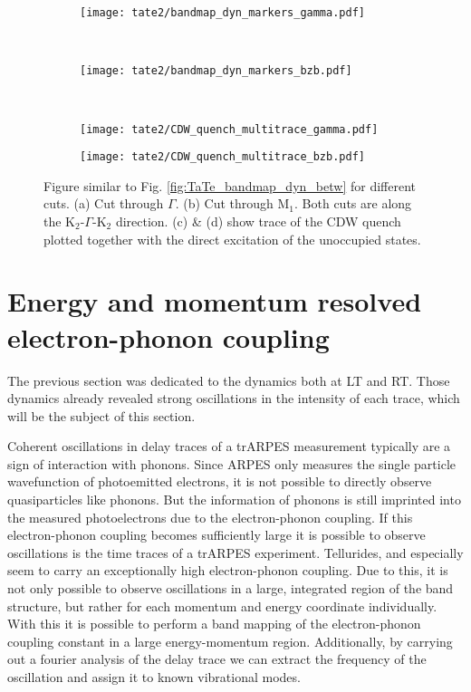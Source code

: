 \begin{figure}[h!]
	\centering
	\begin{subfigure}[b]{\textwidth}
		\texttt{[image: tate2/bandmap\_dyn\_markers\_gamma.pdf]}
		\caption{}
	\end{subfigure}
	\\
	\centering
	\begin{subfigure}[b]{\textwidth}
		\texttt{[image: tate2/bandmap\_dyn\_markers\_bzb.pdf]}
		\caption{}
	\end{subfigure}
	\\
	\begin{subfigure}[b]{0.33\textwidth}
		\texttt{[image: tate2/CDW\_quench\_multitrace\_gamma.pdf]}
		\caption{}
	\end{subfigure}
	\begin{subfigure}[b]{0.33\textwidth}
		\texttt{[image: tate2/CDW\_quench\_multitrace\_bzb.pdf]}
		\caption{}
	\end{subfigure}
	\caption{Figure similar to Fig. \ref{fig:TaTe_bandmap_dyn_betw} for different cuts. (a) Cut through $\Gamma$. (b) Cut through M$_1$. Both cuts are along the K$_2$-$\Gamma$-K$_2$ direction. (c) \& (d) show trace of the CDW quench plotted together with the direct excitation of the unoccupied states.}
	\label{fig:TaTe_bandmap_dyn_bzb}
\end{figure}

\section{Energy and momentum resolved electron-phonon coupling}
\label{sec:phonon_osc}

The previous section was dedicated to the dynamics both at LT and RT.
Those dynamics already revealed strong oscillations in the intensity of each trace, which will be the subject of this section.

Coherent oscillations in delay traces of a trARPES measurement typically are a sign of interaction with phonons.
Since ARPES only measures the single particle wavefunction of photoemitted electrons, it is not possible to directly observe quasiparticles like phonons.
But the information of phonons is still imprinted into the measured photoelectrons due to the electron-phonon coupling.
If this electron-phonon coupling becomes sufficiently large it is possible to observe oscillations is the time traces of a trARPES experiment.
Tellurides, and especially  seem to carry an exceptionally high electron-phonon coupling.
Due to this, it is not only possible to observe oscillations in a large, integrated region of the band structure, but rather for each momentum and energy coordinate individually.
With this it is possible to perform a band mapping of the electron-phonon coupling constant in a large energy-momentum region.
Additionally, by carrying out a fourier analysis of the delay trace we can extract the frequency of the oscillation and assign it to known vibrational modes.

